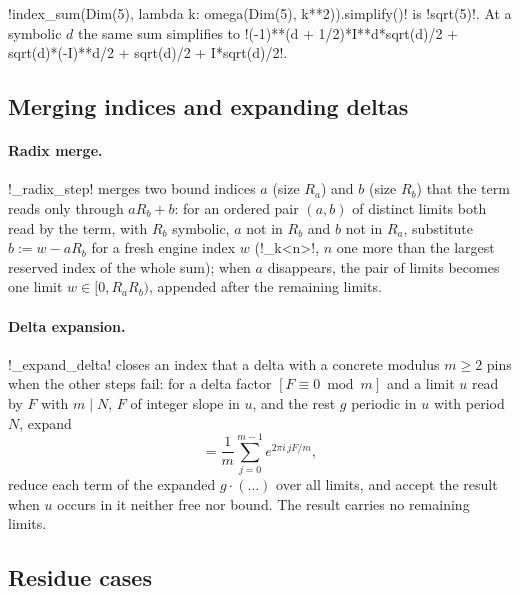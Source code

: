 \begin{example}
\py!index_sum(Dim(5), lambda k: omega(Dim(5), k**2)).simplify()! is \code!sqrt(5)!. At a symbolic $d$ the same sum simplifies to \code!(-1)**(d + 1/2)*I**d*sqrt(d)/2 + sqrt(d)*(-I)**d/2 + sqrt(d)/2 + I*sqrt(d)/2!.
\end{example}

\subsection{Merging indices and expanding deltas}\label{sec:algebra-simplify-merge}

\paragraph{Radix merge.} \py!_radix_step! merges two bound indices $a$ (size $R_a$) and $b$ (size $R_b$) that the term reads only through $aR_b+b$: for an ordered pair $(a,b)$ of distinct limits both read by the term, with $R_b$ symbolic, $a$ not in $R_b$ and $b$ not in $R_a$, substitute $b:=w-aR_b$ for a fresh engine index $w$ (\code!_k<n>!, $n$ one more than the largest reserved index of the whole sum); when $a$ disappears, the pair of limits becomes one limit $w\in[0,R_aR_b)$, appended after the remaining limits.

\paragraph{Delta expansion.} \py!_expand_delta! closes an index that a delta with a concrete modulus $m\ge 2$ pins when the other steps fail: for a delta factor $[F\equiv0\bmod m]$ and a limit $u$ read by $F$ with $m\mid N$, $F$ of integer slope in $u$, and the rest $g$ periodic in $u$ with period $N$, expand
\begin{equation}
[F\equiv 0\bmod m]=\frac1m\sum_{j=0}^{m-1}e^{2\pi i\,jF/m},
\end{equation}
reduce each term of the expanded $g\cdot(\ldots)$ over all limits, and accept the result when $u$ occurs in it neither free nor bound. The result carries no remaining limits.

\subsection{Residue cases}\label{sec:algebra-simplify-cases}

